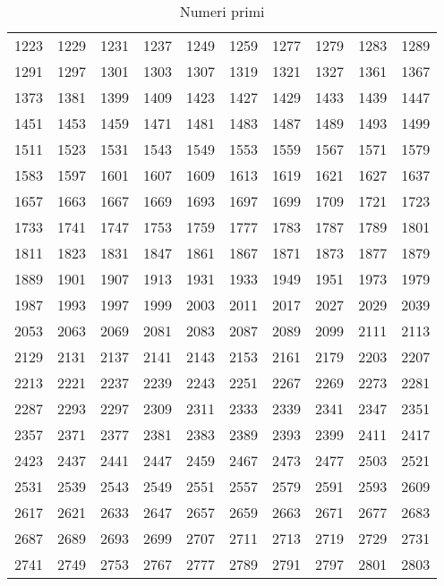 \begin{table}[H]
\begin{tabular}{llllllllll}
1223 &1229 &1231 &1237 &1249 &1259 &1277 &1279 &1283 &1289 \\
1291 &1297 &1301 &1303 &1307 &1319 &1321 &1327 &1361 &1367 \\
1373 &1381 &1399 &1409 &1423 &1427 &1429 &1433 &1439 &1447 \\
1451 &1453 &1459 &1471 &1481 &1483 &1487 &1489 &1493 &1499 \\
1511 &1523 &1531 &1543 &1549 &1553 &1559 &1567 &1571 &1579 \\
1583 &1597 &1601 &1607 &1609 &1613 &1619 &1621 &1627 &1637 \\
1657 &1663 &1667 &1669 &1693 &1697 &1699 &1709 &1721 &1723 \\
1733 &1741 &1747 &1753 &1759 &1777 &1783 &1787 &1789 &1801 \\
1811 &1823 &1831 &1847 &1861 &1867 &1871 &1873 &1877 &1879 \\
1889 &1901 &1907 &1913 &1931 &1933 &1949 &1951 &1973 &1979 \\
1987 &1993 &1997 &1999 &2003 &2011 &2017 &2027 &2029 &2039 \\
2053 &2063 &2069 &2081 &2083 &2087 &2089 &2099 &2111 &2113 \\
2129 &2131 &2137 &2141 &2143 &2153 &2161 &2179 &2203 &2207 \\
2213 &2221 &2237 &2239 &2243 &2251 &2267 &2269 &2273 &2281 \\
2287 &2293 &2297 &2309 &2311 &2333 &2339 &2341 &2347 &2351 \\
2357 &2371 &2377 &2381 &2383 &2389 &2393 &2399 &2411 &2417 \\
2423 &2437 &2441 &2447 &2459 &2467 &2473 &2477 &2503 &2521 \\
2531 &2539 &2543 &2549 &2551 &2557 &2579 &2591 &2593 &2609 \\
2617 &2621 &2633 &2647 &2657 &2659 &2663 &2671 &2677 &2683 \\
2687 &2689 &2693 &2699 &2707 &2711 &2713 &2719 &2729 &2731 \\
2741 &2749 &2753 &2767 &2777 &2789 &2791 &2797 &2801 &2803 \\
\end{tabular}
\caption{Numeri primi}
\end{table}
